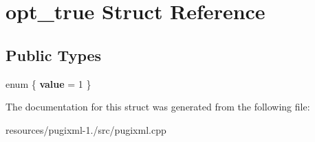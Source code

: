 \hypertarget{structopt__true}{\section{opt\+\_\+true Struct Reference}
\label{structopt__true}
}
\subsection*{Public Types}
\begin{DoxyCompactItemize}
\item 
\hypertarget{structopt__true_a93a7039f202aca3a935c98aa8e069ea5}{enum \{ {\bfseries value} = 1
 \}}\label{structopt__true_a93a7039f202aca3a935c98aa8e069ea5}

\end{DoxyCompactItemize}


The documentation for this struct was generated from the following file\+:\begin{DoxyCompactItemize}
\item 
resources/pugixml-\/1./src/pugixml.\+cpp\end{DoxyCompactItemize}
